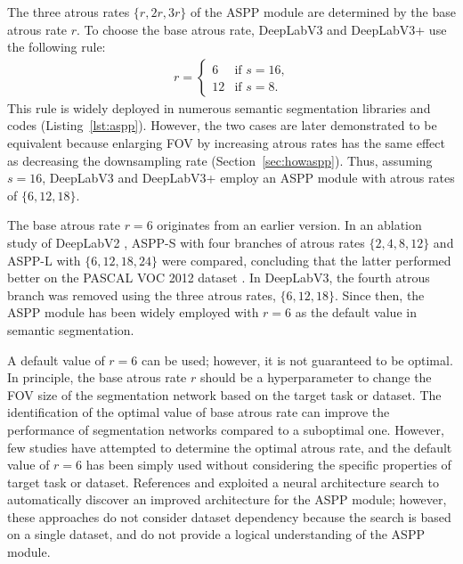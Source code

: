 \documentclass{article}
\def\secref#1{Section~\ref{#1}}
\def\lstref#1{Listing~\ref{#1}}
\begin{document}
The three atrous rates $\{r, 2r, 3r\}$ of the ASPP module are determined by the base atrous rate $r$. To choose the base atrous rate, DeepLabV3 \citep{DBLP:journals/corr/ChenPSA17} and DeepLabV3+ \citep{DBLP:conf/eccv/ChenZPSA18} use the following rule:
\begin{align}
	r = \begin{cases}
		    6  & \text{if $s = 16$,} \\
		    12 & \text{if $s = 8$.}
	    \end{cases} \label{eq:bar}
\end{align}
This rule is widely deployed in numerous semantic segmentation libraries and codes (\lstref{lst:aspp}). However, the two cases are later demonstrated to be equivalent because enlarging FOV by increasing atrous rates has the same effect as decreasing the downsampling rate (\secref{sec:howaspp}). Thus, assuming $s=16$, DeepLabV3 and DeepLabV3+ employ an ASPP module with atrous rates of $\{6, 12, 18\}$.


The base atrous rate $r=6$ originates from an earlier version. In an ablation study of DeepLabV2 \citep{DBLP:journals/pami/ChenPKMY18}, ASPP-S with four branches of atrous rates $\{2, 4, 8, 12\}$ and ASPP-L with $\{6, 12, 18, 24\}$ were compared, concluding that the latter performed better on the PASCAL VOC 2012 dataset \citep{DBLP:journals/ijcv/EveringhamEGWWZ15}. In DeepLabV3, the fourth atrous branch was removed using the three atrous rates, $\{6, 12, 18\}$. Since then, the ASPP module has been widely employed with $r=6$ as the default value in semantic segmentation.

A default value of $r=6$ can be used; however, it is not guaranteed to be optimal. In principle, the base atrous rate $r$ should be a hyperparameter to change the FOV size of the segmentation network based on the target task or dataset. The identification of the optimal value of base atrous rate can improve the performance of segmentation networks compared to a suboptimal one. However, few studies have attempted to determine the optimal atrous rate, and the default value of $r=6$ has been simply used without considering the specific properties of target task or dataset. References \citep{DBLP:conf/nips/ChenCZPZSAS18} and \citep{DBLP:conf/cvpr/LiuCSAHY019} exploited a neural architecture search to automatically discover an improved architecture for the ASPP module; however, these approaches do not consider dataset dependency because the search is based on a single dataset, and do not provide a logical understanding of the ASPP module.
\end{document}
